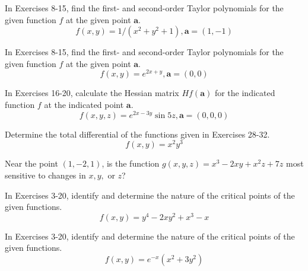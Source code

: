 \documentclass[12pt,letterpaper]{hmcpset}
\begin{document}

\begin{problem}[Colley 4.1.9]
    In Exercises 8-15, find the first- and second-order Taylor
    polynomials for the given function $f$ at the given point
    $\mathbf{a}$.
    \[
        f(x,y)=1/(x^2+y^2+1),\mathbf{a}=(1,-1)
    \]
\end{problem}
\begin{solution}
    \vfill
\end{solution}
\newpage

\begin{problem}[Colley 4.1.10]
    In Exercises 8-15, find the first- and second-order Taylor
    polynomials for the given function $f$ at the given point
    $\mathbf{a}$.
    \[
        f(x,y)=e^{2x+y},\mathbf{a}=(0,0)
    \]
\end{problem}
\begin{solution}
    \vfill
\end{solution}
\newpage

\begin{problem}[Colley 4.1.20]
    In Exercises 16-20, calculate the Hessian matrix $Hf(\mathbf{a})$
    for the indicated function $f$ at the indicated point
    $\mathbf{a}$.
    \[
        f(x,y,z)=e^{2x-3y}\sin 5z,\mathbf{a}=(0,0,0)
    \]
\end{problem}
\begin{solution}
    \vfill
\end{solution}
\newpage

\begin{problem}[Colley 4.1.28]
    Determine the total differential of the functions given in
    Exercises 28-32.
    \[
        f(x,y)=x^2y^3
    \]
\end{problem}
\begin{solution}
    \vfill
\end{solution}
\newpage

\begin{problem}[Colley 4.1.34]
    Near the point $(1,-2, 1)$, is the function
    $g(x,y,z)=x^3-2xy+x^2z+7z$ most sensitive to changes in $x,y,$ or
    $z$?
\end{problem}
\begin{solution}
    \vfill
\end{solution}
\newpage

\begin{problem}[Colley 4.2.6]
    In Exercises 3-20, identify and determine the nature of the
    critical points of the given functions.
    \[
        f(x,y)=y^4-2xy^2+x^3-x
    \]
\end{problem}
\begin{solution}
    \vfill
\end{solution}
\newpage

\begin{problem}[Colley 4.2.12]
    In Exercises 3-20, identify and determine the nature of the
    critical points of the given functions.
    \[
        f(x,y)=e^{-x}(x^2+3y^2)
    \]
\end{problem}
\begin{solution}
    \vfill
\end{solution}
\end{document}

